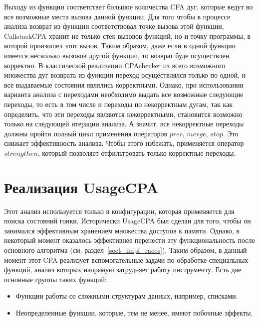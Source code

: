 Выходу из функции соответствет большое количества CFA дуг, которые ведут во все возможные места вызова данной функции.
Для того чтобы в процессе анализа возврат из функции соответствовал точке вызова этой функции, CallstackCPA хранит не только стек вызовов функций, но и точку программы, в которой произошел этот вызов.
Таким образом, даже если в одной функции имеется несколько вызовов другой функции, то возврат буде осуществлен корректно.
В классической реализации CPAchecker из всего возможного множества дуг возврата из функции переход осуществлялся только по одной, и все выдаваемые состояния являлись корректными.
Однако, при использовании варианта анализа с переходами необходимо выдать все возможные следующие переходы, то есть в том числе и переходы по некорректным дугам, так как определить, что эти переходы являются некорректными, становится возможно только на следующей итерации анализа.
А значит, все некорректные переходы должны пройти полный цикл применения операторов $prec$, $merge$, $stop$.
Это снижает эффективность анализа.
Чтобы этого избежать, применяется оператор $strengthen$, который позволяет отфильтровать только корректные переходы.

\section{Реализация UsageCPA}
\label{sect_impl_usage}
Этот анализ используется только в конфигурации, которая применяется для поиска состояний гонки.
Исторически UsageCPA был сделан для того, чтобы он занимался эффективным хранением множества доступов к памяти.
Однако, в некоторый момент оказалось эффективнее перенести эту функциональность после основного алгоритма (см. раздел~\ref{sect_impl_races}).
Таким образом, в данный момент этот CPA реализует вспомогательные задачи по обработке специальных функций, анализ которых напрямую затрудняет работу инструменту.
Есть две основные группы таких функций:
\begin{itemize}
\item Функции работы со сложными структурам данных, например, списками.
\item Неопределенные функции, которые, тем не менее, имеют побочные эффекты.
\end{itemize}

